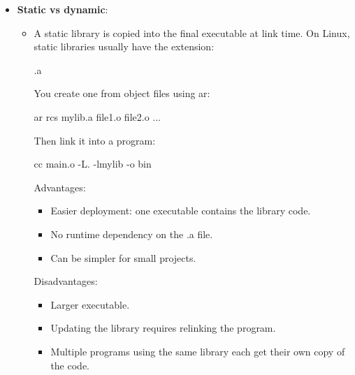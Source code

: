 \documentclass{report}
\begin{document}
        \pagebreak 
        \begin{itemize}
            \item \textbf{Static vs dynamic}: 
                \begin{itemize}
                    \item A static library is copied into the final executable at link time.
                        \bigbreak \noindent 
                        On Linux, static libraries usually have the extension:
                        \bigbreak \noindent 
                        \begin{bashcode}
                        .a
                        \end{bashcode}
                        \bigbreak \noindent 
                        You create one from object files using ar:
                        \bigbreak \noindent 
                        \begin{cppcode}
                        ar rcs mylib.a file1.o file2.o ...
                        \end{cppcode}
                        \bigbreak \noindent 
                        Then link it into a program:
                        \bigbreak \noindent 
                        \begin{bashcode}
                        cc main.o -L. -lmylib -o bin
                        \end{bashcode}
                        \bigbreak \noindent 
                        Advantages:
                        \begin{itemize}
                            \item Easier deployment: one executable contains the library code.
                            \item No runtime dependency on the .a file.
                            \item Can be simpler for small projects.
                        \end{itemize}
                        Disadvantages:
                        \begin{itemize}
                            \item Larger executable.
                            \item Updating the library requires relinking the program.
                            \item Multiple programs using the same library each get their own copy of the code.
                        \end{itemize}

\end{itemize}
\end{itemize}
\end{document}
